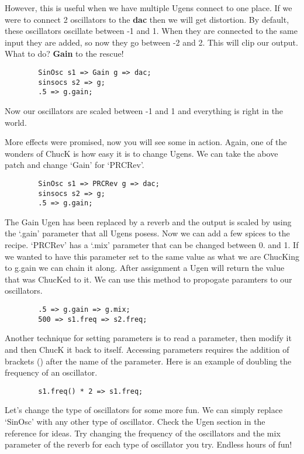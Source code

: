 However, this is useful when we have multiple Ugens connect to one place. If we were to connect 2 oscillators to the {\bf dac} then we will get distortion. By default, these oscillators oscillate between -1 and 1. When they are connected to the same input they are added, so now they go between -2 and 2. This will clip our output. What to do? {\bf Gain} to the rescue!

\begin{verbatim}
        SinOsc s1 => Gain g => dac;
        sinsocs s2 => g;
        .5 => g.gain;
\end{verbatim}

Now our oscillators are scaled between -1 and 1 and everything is right in the world.

More effects were promised, now you will see some in action. Again, one of the wonders of ChucK is how easy it is to change Ugens. We can take the above patch and change `Gain' for `PRCRev'.

\begin{verbatim}
        SinOsc s1 => PRCRev g => dac;
        sinsocs s2 => g;
        .5 => g.gain;
\end{verbatim}

The Gain Ugen has been replaced by a reverb and the output is scaled by using the `.gain' parameter that all Ugens posess. Now we can add a few spices to the recipe. `PRCRev' has a `.mix' parameter that can be changed between 0. and 1. If we wanted to have this parameter set to the same value as what we are ChucKing to g.gain we can chain it along. After assignment a Ugen will return the value that was ChucKed to it. We can use this method to propogate paramters to our oscillators.

\begin{verbatim}
        .5 => g.gain => g.mix;
        500 => s1.freq => s2.freq;
\end{verbatim}

Another  technique for setting parameters is to read a parameter, then modify it and then ChucK it back to itself. Accessing parameters requires the addition of brackets () after the name of the parameter. Here is an example of doubling the frequency of an oscillator. 

\begin{verbatim}
        s1.freq() * 2 => s1.freq;
\end{verbatim}

Let's change the type of oscillators for some more fun. We can simply replace `SinOsc' with any other type of oscillator. Check the Ugen section in the reference for ideas. Try changing the frequency of the oscillators and the mix parameter of the reverb for each type of oscillator you try. Endless hours of fun!
